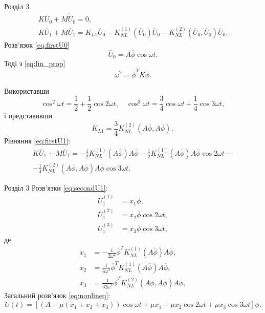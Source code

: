 \documentclass[8pt]{beamer}
\numberwithin{figure}{section}
\numberwithin{equation}{section}
\numberwithin{table}{section}
\begin{document}
\begin{frame}{Розділ 3}
\begin{gather}
\label{eq:firstU0}
K\overline{U}_0+M\ddot{\overline{U}}_0=0,\\
\label{eq:firstU1}
K\overline{U}_1+M\ddot{\overline{U}}_1=K_{L1}\overline{U}_0-K_{NL}^{(1)}\left( \overline{U}_0 \right) \overline{U}_0-K_{NL}^{(2)}\left( \overline{U}_0,\overline{U}_0\right)\overline{U}_0.
\end{gather}
Розв'язок \eqref{eq:firstU0}
\begin{equation}
\overline{U}_0=A\overline{\phi}\cos\omega t.
\end{equation}
Тоді з \eqref{eq:lin_prop}
\begin{equation}
\omega^2=\overline{\phi}^T K \overline{\phi}.
\end{equation}

Використавши
\begin{equation}
\cos^2 \omega t = \frac12 + \frac12 \cos 2 \omega t , \quad
\cos^3 \omega t = \frac34 \cos \omega t + \frac14 \cos 3 \omega t,
\end{equation}
і представивши
\begin{equation}
K_{L1} = \frac34 K_{NL}^{(2)}\left( A\overline{\phi},A\overline{\phi} \right),
\end{equation}
Рівняння \eqref{eq:firstU1}:
\begin{multline}\label{eq:secondU1}
K\overline{U}_1+M\ddot{\overline{U}}_1=-\frac12 K_{NL}^{(1)}\left( A\overline{\phi} \right) A\overline{\phi} -\frac12 K_{NL}^{(1)}\left( A\overline{\phi} \right) A\overline{\phi} \cos 2\omega t -\\ - \frac14 K_{NL}^{(2)}\left( A\overline{\phi},A\overline{\phi}\right)A\overline{\phi} \cos 3\omega t.
\end{multline}

\end{frame}


\begin{frame}{Розділ 3}
Розв'язки \eqref{eq:secondU1}:
\begin{align}
\overline{U}_1^{(1)}&=x_1\overline{\phi},\\
\overline{U}_1^{(2)}&=x_2\overline{\phi}\cos 2\omega t,\\
\overline{U}_1^{(3)}&=x_3\overline{\phi}\cos 3\omega t,
\end{align}
де
\begin{align}
x_1&=-\frac{1}{2\omega ^2}\overline{\phi}^T K_{NL}^{(1)}\left( A\overline{\phi} \right) A\overline{\phi},\\
x_2&=\frac{1}{6\omega ^2}\overline{\phi}^T K_{NL}^{(1)}\left( A\overline{\phi} \right) A\overline{\phi},\\
x_3&=\frac{1}{32\omega ^2}\overline{\phi}^T K_{NL}^{(2)}\left( A\overline{\phi},A\overline{\phi} \right) A\overline{\phi},
\end{align}
Загальний розв'язок \eqref{eq:nonlineq}:
\begin{equation}
\overline{U}\left(t\right)=\left[\left(A-\mu(x_1+x_2+x_3)\right)\cos \omega t +\mu x_1+ \mu x_2\cos 2 \omega t+ \mu x_3\cos 3 \omega t\right]\overline{\phi}.
\end{equation}
\end{frame}
\end{document}
